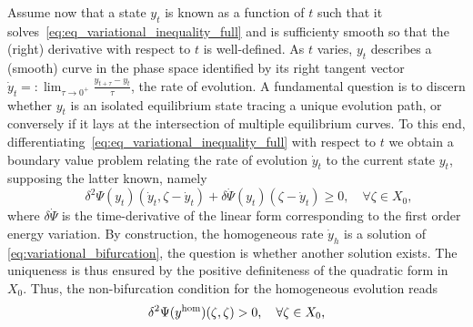 Assume now that a state $y_t$ is known as a function of $t$ such that it solves~\eqref{eq:eq_variational_inequality_full} and is sufficienty smooth so that the (right) derivative with respect to $t$ is well-defined. 
As $t$ varies, $y_t$ describes a (smooth) curve in the phase space identified by its right tangent vector $\dot y_t =: \lim_{\tau\to 0^+}\frac{y_{t+\tau} - y_t}{\tau}$, the rate of evolution.
A fundamental question is to discern whether $y_t$ is an isolated equilibrium state tracing a unique evolution path, or conversely if it lays at the intersection of multiple equilibrium curves.
To this end, differentiating~\eqref{eq:eq_variational_inequality_full} with respect to $t$ we  obtain a boundary value problem relating the rate of evolution $\dot y_t$ to the current state $y_t$, supposing the latter known, namely
% 
\begin{equation}
    \label{eq:variational_bifurcation}
    \qquad \delta^2 \Psi(y_t)(\dot y_t,   \zeta -\dot y_t) + \delta \dot \Psi(y_t)(\zeta-\dot y_t) \geq 0, \quad \forall \zeta\in X_{0},
\end{equation}
where $\delta \dot \Psi$ is the time-derivative of the linear form corresponding to the first order energy variation.
By construction, the homogeneous rate $\dot y_h$ is a solution of \eqref{eq:variational_bifurcation}, the question is whether another solution exists. The uniqueness is thus ensured by the positive definiteness of the quadratic form 
in $X_0$. 
Thus, the non-bifurcation condition for the homogeneous evolution reads
\begin{equation}
    \label{eq:bifurcation_uniqueness}
    \delta^2 \Psi(y^{\text{hom}})(\zeta, \zeta) > 0, \quad \forall \zeta \in X_0,
\end{equation}
